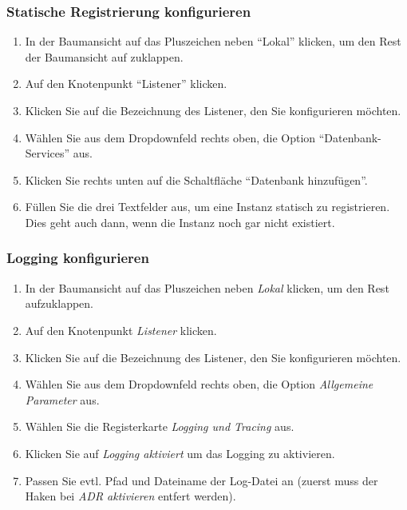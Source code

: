         \subsubsection{Statische Registrierung konfigurieren}
          \begin{enumerate}
            \item In der Baumansicht auf das Pluszeichen neben \enquote{Lokal} klicken, um den Rest der Baumansicht auf zuklappen.
            \item Auf den Knotenpunkt \enquote{Listener} klicken.
            \item Klicken Sie auf die Bezeichnung des Listener, den Sie konfigurieren m\"ochten.
\clearpage
            \item W\"ahlen Sie aus dem Dropdownfeld rechts oben, die Option \enquote{Datenbank-Services} aus.
            \item Klicken Sie rechts unten auf die Schaltfl\"ache \enquote{Datenbank hinzuf\"ugen}.
            \item F\"ullen Sie die drei Textfelder aus, um eine Instanz statisch zu registrieren. Dies geht auch dann, wenn die Instanz noch gar nicht existiert.
          \end{enumerate}
        \subsubsection{Logging konfigurieren}
          \begin{enumerate}
            \item In der Baumansicht auf das Pluszeichen neben \textit{Lokal} klicken, um den Rest  aufzuklappen.
            \item Auf den Knotenpunkt \textit{Listener} klicken.
            \item Klicken Sie auf die Bezeichnung des Listener, den Sie konfigurieren m\"ochten.
\clearpage
            \item W\"ahlen Sie aus dem Dropdownfeld rechts oben, die Option \textit{Allgemeine Parameter} aus.
            \item W\"ahlen Sie die Registerkarte \textit{Logging und Tracing} aus.
            \item Klicken Sie auf \textit{Logging aktiviert} um das Logging zu aktivieren.
            \item Passen Sie evtl. Pfad und Dateiname der Log-Datei an (zuerst muss der Haken bei \textit{ADR aktivieren} entfert werden).
          \end{enumerate}
